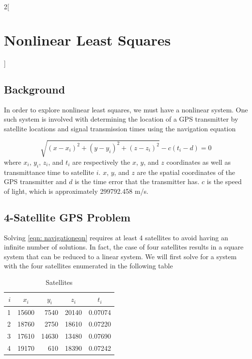 \documentclass[10pt,a4paper]{article}
\begin{document}
\begin{multicols*}{2}[ \section*{Nonlinear Least Squares} ]

\subsection*{Background}

In order to explore nonlinear least squares, we must have a nonlinear system. One such system is involved with determining the location of a GPS transmitter by satellite locations and signal transmission times using the navigation equation

\begin{equation}
\sqrt{ \left( x - x_i \right)^2 + \left( y - y_i \right)^2 + \left( z - z_i \right)^2 } - c \left( t_i - d \right) = 0
\label{eqn: navigationeqn}
\end{equation}
where $x_i$, $y_i$, $z_i$, and $t_i$ are respectively the $x$, $y$, and $z$ coordinates as well as transmittance time to satellite $i$. $x$, $y$, and $z$ are the spatial coordinates of the GPS transmitter and $d$ is the time error that the transmitter has. $c$ is the speed of light, which is approximately 299792.458 m/s.

\subsection*{4-Satellite GPS Problem}

Solving \cref{eqn: navigationeqn} requires at least 4 satellites to avoid having an infinite number of solutions. In fact, the case of four satellites results in a square system that can be reduced to a linear system. We will first solve for a system with the four satellites enumerated in the following table

\begin{table}[H]
\begin{tabular}{r|rrrr}
$i$ & \multicolumn{1}{c}{$x_i$} & \multicolumn{1}{c}{$y_i$} & \multicolumn{1}{c}{$z_i$} & \multicolumn{1}{c}{$t_i$} \\ \hline
1 & 15600                    & 7540                     & 20140                    & 0.07074                  \\
2 & 18760                    & 2750                     & 18610                    & 0.07220                  \\
3 & 17610                    & 14630                    & 13480                    & 0.07690                  \\
4 & 19170                    & 610                      & 18390                    & 0.07242                 
\end{tabular}
\caption{Satellites}
\label{table: satellites}
\end{table}


\end{multicols*}
\end{document}
